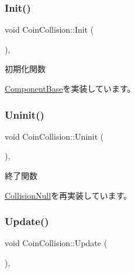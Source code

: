 \subsubsection{\texorpdfstring{Init()}{Init()}}
{\footnotesize\ttfamily void Coin\+Collision\+::\+Init (\begin{DoxyParamCaption}{ }\end{DoxyParamCaption})\hspace{0.3cm}{\ttfamily [override]}, {\ttfamily [virtual]}}



初期化関数 



\mbox{\hyperlink{class_component_base_a125939d6befe42f28886a6523e86b18b}{Component\+Base}}を実装しています。

\mbox{\label{class_coin_collision_aa852afdcdbedcf82809df9c7fd99be9e}} 
\subsubsection{\texorpdfstring{Uninit()}{Uninit()}}
{\footnotesize\ttfamily void Coin\+Collision\+::\+Uninit (\begin{DoxyParamCaption}{ }\end{DoxyParamCaption})\hspace{0.3cm}{\ttfamily [override]}, {\ttfamily [virtual]}}



終了関数 



\mbox{\hyperlink{class_collision_null_a7c6d0ec502efc55e2f406415451152f5}{Collision\+Null}}を再実装しています。

\mbox{\label{class_coin_collision_a981fd9b1b8c688a757a456a56d80501b}} 
\subsubsection{\texorpdfstring{Update()}{Update()}}
{\footnotesize\ttfamily void Coin\+Collision\+::\+Update (\begin{DoxyParamCaption}{ }\end{DoxyParamCaption})\hspace{0.3cm}{\ttfamily [override]}, {\ttfamily [virtual]}}



